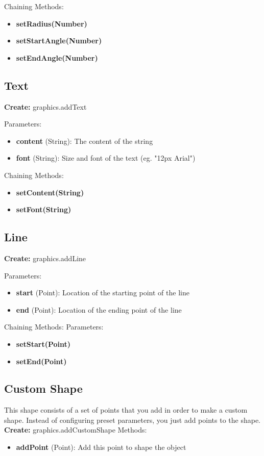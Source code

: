 \documentclass{article}
\begin{document}
Chaining Methods:
\begin{itemize}
\item \textbf{setRadius(Number)} 
\item \textbf{setStartAngle(Number)}
\item \textbf{setEndAngle(Number)}
\end{itemize}

\subsection{Text}
\textbf{Create:} graphics.addText

Parameters:
\begin{itemize}
\item \textbf{content} (String): The content of the string
\item \textbf{font} (String): Size and font of the text (eg. "12px Arial")
\end{itemize}

Chaining Methods:
\begin{itemize}
\item \textbf{setContent(String)} 
\item \textbf{setFont(String)}
\end{itemize}

\subsection{Line}
\textbf{Create:} graphics.addLine

Parameters:
\begin{itemize}
\item \textbf{start} (Point): Location of the starting point of the line
\item \textbf{end} (Point): Location of the ending point of the line
\end{itemize}

Chaining Methods:
Parameters:
\begin{itemize}
\item \textbf{setStart(Point)} 
\item \textbf{setEnd(Point)}
\end{itemize}

\subsection{Custom Shape}
This shape consists of a set of points that you add in order to make a custom shape.
Instead of configuring preset parameters, you just add points to the shape. 
\textbf{Create:} graphics.addCustomShape
Methods:
\begin{itemize}
\item \textbf{addPoint} (Point): Add this point to shape the object
\end{itemize}
\end{document}
